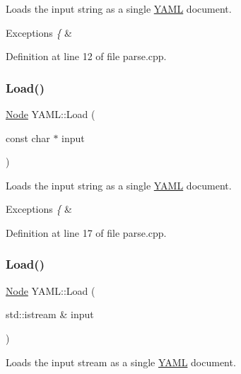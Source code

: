 Loads the input string as a single \mbox{\hyperlink{namespace_y_a_m_l}{Y\+A\+ML}} document.


\begin{DoxyExceptions}{Exceptions}
{\em \{} & \\
\hline
\end{DoxyExceptions}


Definition at line 12 of file parse.\+cpp.

\mbox{\label{namespace_y_a_m_l_acd7999f5ac4527cd207e824452a3a08c}} 
\subsubsection{\texorpdfstring{Load()}{Load()}\hspace{0.1cm}{\footnotesize\ttfamily [2/3]}}
{\footnotesize\ttfamily \mbox{\hyperlink{class_y_a_m_l_1_1_node}{Node}} Y\+A\+M\+L\+::\+Load (\begin{DoxyParamCaption}\item[{const char $\ast$}]{input }\end{DoxyParamCaption})}

Loads the input string as a single \mbox{\hyperlink{namespace_y_a_m_l}{Y\+A\+ML}} document.


\begin{DoxyExceptions}{Exceptions}
{\em \{} & \\
\hline
\end{DoxyExceptions}


Definition at line 17 of file parse.\+cpp.

\mbox{\label{namespace_y_a_m_l_a56ff264a6b5e45a472ff3141f15fc5d1}} 
\subsubsection{\texorpdfstring{Load()}{Load()}\hspace{0.1cm}{\footnotesize\ttfamily [3/3]}}
{\footnotesize\ttfamily \mbox{\hyperlink{class_y_a_m_l_1_1_node}{Node}} Y\+A\+M\+L\+::\+Load (\begin{DoxyParamCaption}\item[{std\+::istream \&}]{input }\end{DoxyParamCaption})}

Loads the input stream as a single \mbox{\hyperlink{namespace_y_a_m_l}{Y\+A\+ML}} document.


